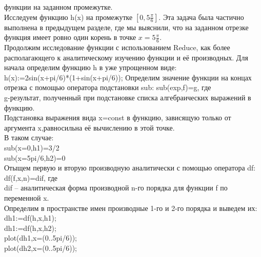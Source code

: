\documentclass[russian,utf8,nocolumnxxxi,nocolumnxxxii]{eskdtext}
\begin{document}
\newpage
{ функции на заданном промежутке.}\\
Исследуем функцию h(x) на промежутке $[0,5\frac{\pi}{6}]$.
Эта задача была частично выполнена в предыдущем разделе, где мы выяснили, что на заданном отрезке функция имеет ровно один корень в точке $x=5\frac{\pi}{6}$.\\
Продолжим исследование функции с использованием Reduce, как более располагающего к аналитическому изучению функции и её производных. Для начала определим функцию h в уже упрощенном виде:\\
h(x):=2sin(x+pi/6)*(1+sin(x+pi/6));
Определим значение функции на концах отрезка с помощью оператора подстановки sub:
sub(exp,f)=g, где\\
g-результат, полученный при подстановке списка алгебраических выражений в функцию.\\
Подстановка выражения вида x=const в функцию, зависящую только от аргумента x,равносильна её вычислению в этой точке.\\
В таком случае:\\
sub(x=0,h1)=3/2\\
sub(x=5pi/6,h2)=0\\
Отыщем первую и вторую производную аналитически с помощью оператора df:\\
df(f,x,n)=dif, где\\
dif – аналитическая форма производной n-го порядка для функции f по переменной x.\\
Определим в пространстве имен производные 1-го и 2-го порядка и выведем их:\\
dh1:=df(h,x,h1);\\
dh1:=df(h,x,h2);\\
plot(dh1,x=(0..5pi/6));\\
plot(dh2,x=(0..5pi/6));\\
\begin{figure}[H]
\begin{center}
\begin{minipage}[h]{0.77\linewidth}
\end{minipage}
\end{center}
\end{figure}
\end{document}
